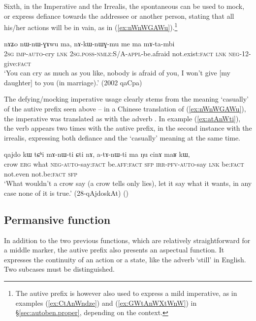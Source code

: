 Sixth, in the Imperative and the Irrealis, the spontaneous can be used to mock, or express defiance towards the addressee or another person, stating that all his/her actions will be in vain, as in (\ref{ex:nWnWGAWu}).\footnote{The autive prefix is however also used to express a mild imperative, as in examples (\ref{ex:CtAnWndze}) and (\ref{ex:GWtAnWXtWnW}) in §\ref{sec:autoben.proper}, depending on the context. }

\begin{exe}
\ex \label{ex:nWnWGAWu}
\gll  nɤʑo nɯ-nɯ-ɣɤwu ma, nɤ-kɯ-nɯɣ-mu me ma mɤ-ta-mbi \\
\textsc{2sg} \textsc{imp}-\textsc{auto}-cry \textsc{lnk} \textsc{2sg}.\textsc{poss}-\textsc{nmlz}:S/A-\textsc{appl}-be.afraid not.exist:\textsc{fact} \textsc{lnk} \textsc{neg}-1\fl{}2-give:\textsc{fact} \\
\glt `You can cry as much as you like, nobody is afraid of you, I won't give [my daughter] to you (in marriage).' (2002 qaCpa)
\end{exe}

The defying/mocking imperative usage clearly stems from the meaning `casually' of the autive prefix seen above -- in a Chinese translation of (\ref{ex:nWnWGAWu}), the imperative  was translated as  with the adverb . In example (\ref{ex:atAnWti}), the verb  appears two times with the autive prefix, in the second instance with the irrealis, expressing both defiance and the `casually' meaning at the same time.

\begin{exe}
\ex \label{ex:atAnWti}
\gll  qajdo kɯ tɕʰi mɤ-nɯ-ti ɕti nɤ, a-tɤ-nɯ-ti ma ŋu cinɤ maʁ kɯ, \\
crow \textsc{erg} what \textsc{neg}-\textsc{auto}-say:\textsc{fact} be.\textsc{aff}:\textsc{fact} \textsc{sfp} \textsc{irr}-\textsc{pfv}-\textsc{auto}-say \textsc{lnk} be:\textsc{fact} not.even not.be:\textsc{fact} \textsc{sfp} \\
\glt `What wouldn't a crow say (a crow tells only lies), let it say what it wants, in any case none of it is true.'  (28-qAjdoskAt)
()
\end{exe}
 
\subsection{Permansive function}  \label{sec:autoben.permansive}
In addition to the two previous functions, which are relatively straightforward for a middle marker, the autive prefix also presents an aspectual function. It expresses the continuity of an action or a state, like the adverb `still' in English. Two subcases must be distinguished.

